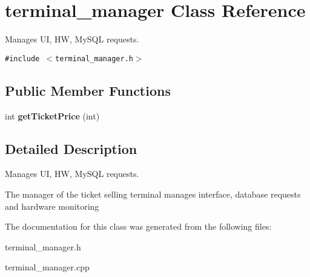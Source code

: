 \hypertarget{classterminal__manager}{
\section{terminal\_\-manager Class Reference}
\label{classterminal__manager}
}
Manages UI, HW, MySQL requests.  


{\tt \#include $<$terminal\_\-manager.h$>$}

\subsection*{Public Member Functions}
\begin{CompactItemize}
\item 
\hypertarget{classterminal__manager_58f1d49f2cec59cfeba82e9ba6b150e7}{
int \textbf{getTicketPrice} (int)}
\label{classterminal__manager_58f1d49f2cec59cfeba82e9ba6b150e7}

\end{CompactItemize}


\subsection{Detailed Description}
Manages UI, HW, MySQL requests. 

The manager of the ticket selling terminal manages interface, database requests and hardware monitoring 

The documentation for this class was generated from the following files:\begin{CompactItemize}
\item 
terminal\_\-manager.h\item 
terminal\_\-manager.cpp\end{CompactItemize}
